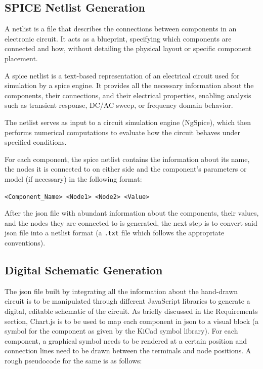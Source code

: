 \subsection{SPICE Netlist Generation}

A netlist is a file that describes the connections between components in an electronic circuit. It acts as a blueprint, specifying which components are connected and how, without detailing the physical layout or specific component placement.

A \gls{spice} netlist is a text-based representation of an electrical circuit used for simulation by a \gls{spice} engine. It provides all the necessary information about the components, their connections, and their electrical properties, enabling analysis such as transient response, DC/AC sweep, or frequency domain behavior.

The netlist serves as input to a circuit simulation engine (NgSpice), which then performs numerical computations to evaluate how the circuit behaves under specified conditions.

For each component, the \gls{spice} netlist contains the information about its name, the nodes it is connected to on either side and the component's parameters or model (if necessary) in the following format:

\begin{center}
\texttt{<Component\_Name> <Node1> <Node2> <Value>}
\end{center}

After the \gls{json} file with abundant information about the components, their values, and the nodes they are connected to is generated, the next step is to convert said \gls{json} file into a netlist format (a \texttt{.txt} file which follows the appropriate conventions).

\subsection{Digital Schematic Generation}

The \gls{json} file built by integrating all the information about the hand-drawn circuit is to be manipulated through different JavaScript libraries to generate a digital, editable schematic of the circuit. As briefly discussed in the Requirements section, Chart.js is to be used to map each component in \gls{json} to a visual block (a symbol for the component as given by the KiCad symbol library). For each component, a graphical symbol needs to be rendered at a certain position and connection lines need to be drawn between the terminals and node positions. A rough pseudocode for the same is as follows:

